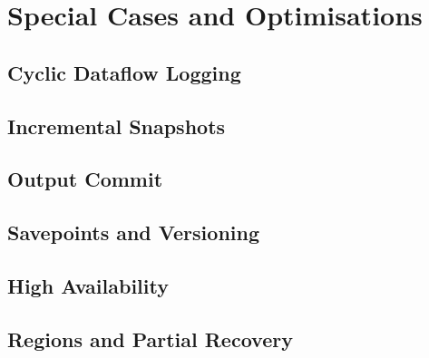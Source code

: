 
\section{Special Cases and Optimisations}

\subsection{Cyclic Dataflow Logging}

\subsection{Incremental Snapshots}

\subsection{Output Commit}

\subsection{Savepoints and Versioning}

\subsection{High Availability}

\subsection{Regions and Partial Recovery}